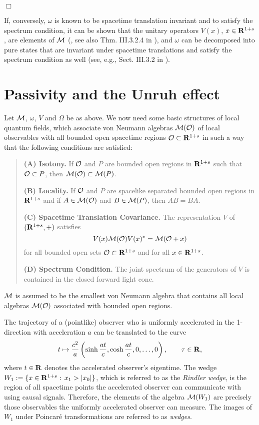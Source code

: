 \documentclass[a4paper,11pt]{article}
\def\dt{\cal}
\def\dM{{\dt M}}
\def\O{{\cal O}}
\def\gO{\Omega}
\def\go{\omega}
\def\Halmos{\quad\hfill$\Box$}
\def\Rd{\reals^{1+s}}
\def\reals{{\bf R}}
\begin{document}
\Halmos

If, conversely, $\go$ is known to be
spacetime translation invariant and to satisfy
the spectrum condition,
it can be shown that the unitary operators
$V(x)$, $x\in\Rd$, are elements of $\dM$
(\cite{Ara64}, see also Thm. III.3.2.4 in \cite{Haa92}),
and $\go$ can be decomposed into pure states
that are invariant under spacetime translations and
satisfy the spectrum condition as well
(see, e.g., Sect. III.3.2 in \cite{Haa92}).

\section{Passivity and the Unruh effect} \label{BW-theorem}

Let $\dM$, $\go$, $V$ and $\gO$ be as above.
We now need some basic structures
of local quantum fields, which associate von Neumann algebras
$\dM(\O)$ of local observables with all bounded open spacetime regions
$\O\subset\Rd$ in such a way that the following conditions are satisfied:
\begin{quote}
{\bf (A) Isotony.} If $\O$ and $P$ are bounded open regions in $\Rd$
such that $\O\subset P$, then $\dM(\O)\subset\dM(P)$.

{\bf (B) Locality.} If $\O$ and $P$ are spacelike separated bounded open
regions in $\Rd$ and if $A\in\dM(\O)$ and $B\in\dM(P)$, then $AB=BA$.

{\bf (C) Spacetime Translation Covariance.} The
representation $V$ of $(\Rd,+)$ satisfies
$$V(x)\dM(\O)V(x)^*=\dM(\O+x)$$
for all bounded open sets $\O\subset\Rd$ and for all $x\in\Rd$.

{\bf (D) Spectrum Condition.} The joint spectrum of the generators of
$V$ is contained in the closed forward light cone.
\end{quote}
$\dM$ is assumed to be the smallest
von Neumann algebra that contains all local algebras $\dM(\O)$
associated with bounded open regions.

The trajectory of a (pointlike) observer who is uniformly accelerated
in the 1-direction with acceleration $a$ can be translated to the
curve
$$t\mapsto\frac{c^2}{a}\left(\sinh\frac{at}{c},
\cosh\frac{at}{c},0,\dots,0\right),\qquad\tau\in\reals,$$
where $t\in\reals$
denotes the accelerated observer's eigentime. The wedge
$W_1:=\{x\in\Rd:\,x_1>|x_0|\}$, which is referred to as the {\em
Rindler wedge}, is the region of all spacetime points the accelerated
observer can communicate with using causal signals. Therefore, the
elements of the algebra $\dM(W_1)$ are precisely those observables the
uniformly accelerated observer can measure. The images of $W_1$ under
Poincar\'e transformations are referred to as {\em wedges}.
\end{document}
